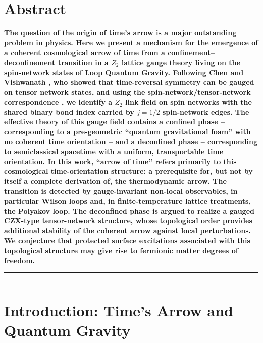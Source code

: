 \documentclass[preprint]{SciPost}
\theoremstyle{plain} %
\begin{document}
\section*{Abstract}
{\bf
The question of the origin of time's arrow is a major outstanding problem in physics. Here we present a mechanism for the emergence of a coherent cosmological arrow of time from a confinement--deconfinement transition in a $ Z_2 $ lattice gauge theory living on the spin-network states of Loop Quantum Gravity. Following Chen and Vishwanath \cite{Chen2015Gauging}, who showed that time-reversal symmetry can be gauged on tensor network states, and using the spin-network/tensor-network correspondence \cite{Qi2013Exact,Han2016Loop}, we identify a $ Z_2 $ link field on spin networks with the shared binary bond index carried by $j=1/2$ spin-network edges. The effective theory of this gauge field contains a confined phase -- corresponding to a pre-geometric ``quantum gravitational foam'' with no coherent time orientation -- and a deconfined phase -- corresponding to semiclassical spacetime with a uniform, transportable time orientation. In this work, ``arrow of time'' refers primarily to this cosmological time-orientation structure: a prerequisite for, but not by itself a complete derivation of, the thermodynamic arrow. The transition is detected by gauge-invariant non-local observables, in particular Wilson loops and, in finite-temperature lattice treatments, the Polyakov loop. The deconfined phase is argued to realize a gauged CZX-type tensor-network structure, whose topological order provides additional stability of the coherent arrow against local perturbations. We conjecture that protected surface excitations associated with this topological structure may give rise to fermionic matter degrees of freedom.
}


\vspace{10pt}
\noindent\rule{\textwidth}{1pt}
\tableofcontents\thispagestyle{fancy}
\noindent\rule{\textwidth}{1pt}
\vspace{10pt}


\section{Introduction: Time's Arrow and Quantum Gravity}\label{sec:intro}
\end{document}
